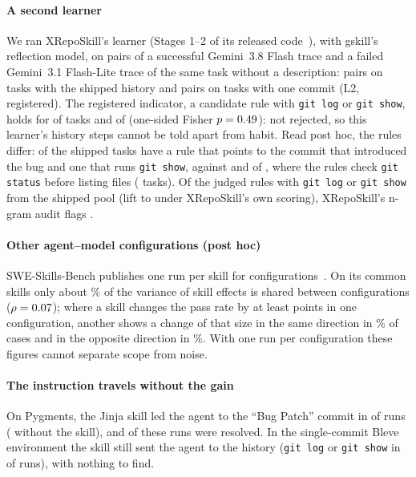 \documentclass[sigconf,review,anonymous]{acmart}
\newcommand{\agentmodel}{Gemini~3.1 Flash-Lite}
\newcommand{\flashmodel}{Gemini~3.8 Flash}
\begin{document}
\paragraph{A second learner}
We ran XRepoSkill's learner (Stages 1--2 of its released code~\cite{xreposkill}), with gskill's
reflection model, on pairs of a successful \flashmodel{} trace and a failed \agentmodel{} trace of
the same task without a description: \nwsPairsA{} pairs on \nwsNA{} tasks with the shipped history
and \nwsPairsB{} pairs on \nwsNB{} tasks with one commit (L2, registered). The registered indicator,
a candidate rule with \texttt{git log} or \texttt{git show}, holds for \nwsGA{} of \nwsNA{} tasks
and \nwsGB{} of \nwsNB{} (one-sided Fisher $p=0.49$): not rejected, so this learner's history
steps cannot be told apart from habit. Read post hoc, the rules differ: \nwsBugA{} of the \nwsNA{}
shipped tasks have a rule that points to the commit that introduced the bug and \nwsShowA{} one that
runs \texttt{git show}, against \nwsBugB{} and \nwsShowB{} of \nwsNB{}, where the rules check
\texttt{git status} before listing files (\nwsStatusB{} tasks). Of the \nwsJudgedGA{} judged rules
with \texttt{git log} or \texttt{git show} from the shipped pool (lift \nwsLiftLoA{} to
\nwsLiftHiA{} under XRepoSkill's own scoring), XRepoSkill's n-gram audit flags \nwsFlagA{}.

\paragraph{Other agent--model configurations (post hoc)}
SWE-Skills-Bench publishes one run per skill for \nsskbConfigs{} configurations~\cite{sskb_paper}.
On its \nsskbSkills{} common skills only about \nsskbRhoPct\% of the variance of skill effects is
shared between configurations ($\rho=0.07$); where a skill changes the pass rate by at least
\nsskbThr{} points in one configuration, another shows a change of that size in the same direction
in \nsskbSamePct\% of cases and in the opposite direction in \nsskbOppPct\%. With one run per
configuration these figures cannot separate scope from noise.

\paragraph{The instruction travels without the gain}
On Pygments, the Jinja skill led the agent to the ``Bug Patch'' commit in \nmonPygFlag{} of
\nmonPygRuns{} runs (\nmonPygNoneFlag{} without the skill), and \nmonPygSolved{} of these runs were
resolved. In the single-commit Bleve environment the skill still sent the agent to the history
(\texttt{git log} or \texttt{git show} in \nmonCmdBleve{} of \nmonCmdBleveRuns{} runs), with nothing
to find.
\end{document}
